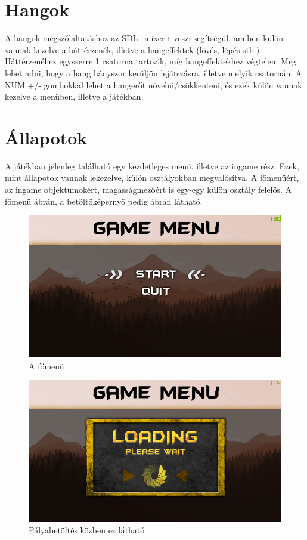 \section{Hangok}

A hangok megszólaltatáshoz az SDL\_mixer-t veszi segítségül, amiben külön vannak kezelve a háttérzenék, illetve a hangeffektek (lövés, lépés stb.). Háttérzenéhez egyszerre 1 csatorna tartozik, míg hangeffektekhez végtelen. Meg lehet adni, hogy a hang hányszor kerüljön lejátszásra, illetve melyik csatornán. A  NUM +/- gombokkal lehet a hangerőt növelni/csökkenteni, és ezek külön vannak kezelve a menüben, illetve a játékban.

\section{Állapotok}

A játékban jelenleg található egy kezdetleges menü, illetve az ingame rész. Ezek, mint állapotok vannak lekezelve, külön osztályokban megvalósítva. A főmenüért, az ingame objektumokért, magasságmezőért is egy-egy külön osztály felelős. A főmenü  ábrán, a betöltőképernyő pedig  ábrán látható.

\begin{figure}[h]
\centering
\includegraphics[scale=1.6]{kepek/menu.png}
\caption{A főmenü}
\label{fig:menu}
\end{figure}

\begin{figure}[h]
\centering
\includegraphics[scale=1.6]{kepek/loading_screen.png}
\caption{Pályabetöltés közben ez látható}
\label{fig:loading}
\end{figure}

